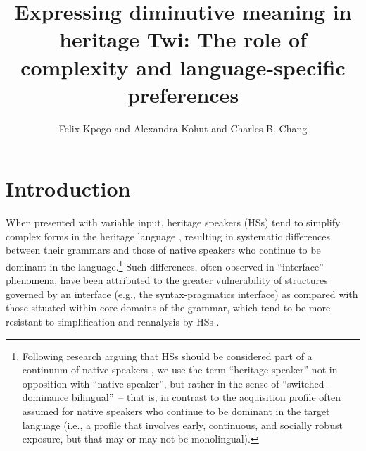 \documentclass[output=paper,colorlinks,citecolor=brown]{langscibook}
\author{Felix Kpogo\affiliation{Boston University} and Alexandra Kohut\affiliation{Boston University}\orcid{} and Charles B. Chang\affiliation{Boston University}\orcid{0000-0002-3537-2053}}
\title{Expressing diminutive meaning in heritage Twi: The role of complexity and language-specific preferences}
\begin{document}
\maketitle

\section{Introduction}
\label{IntroSec}

When presented with variable input, heritage speakers (HSs) tend to simplify complex forms in the heritage language \citep[HL; see][]{KimJH2007, IsurinIvanovaSullivan2008, IvanovaSullivan2014, ScontrasFuchsPolinsky2015, ScontrasPolinskyTsaiMai2017}, resulting in systematic differences between their grammars and those of native speakers who continue to be dominant in the language.\footnote{Following research arguing that HSs should be considered part of a continuum of native speakers \citep{RothmanTreffersDaller2014, WieseAlexiadouAllenBunkGagarinaIefremenkoMartynovaPashkovaRizouSchroederShadrovaSzucsichTracyTsehayeZerbianZuban2022}, we use the term ``heritage speaker'' not in opposition with ``native speaker'', but rather in the sense of ``switched-dominance bilingual''~-- that is, in contrast to the acquisition profile often assumed for native speakers who continue to be dominant in the target language (i.e., a profile that involves early, continuous, and socially robust exposure, but that may or may not be monolingual).} Such differences, often observed in ``interface'' phenomena, have been attributed to the greater vulnerability of structures governed by an interface (e.g., the syntax-pragmatics interface) as compared with those situated within core domains of the grammar, which tend to be more resistant to simplification and reanalysis by HSs \citep{HulkMuller2000, Sorace2000, TsimpliSoraceHeycockFiliaci2004}. 
\end{document}
